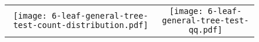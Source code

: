 \documentclass[border=10pt,varwidth=30cm]{standalone}
\begin{document}
\begin{figure}
    \setlength\arrayrulewidth{2pt}
    \centering
    \begin{tabular}{@{}cc@{}}
        \texttt{[image: 6-leaf-general-tree-test-count-distribution.pdf]}
        &
        \texttt{[image: 6-leaf-general-tree-test-qq.pdf]}
        \\
    \end{tabular}
\end{figure}
\end{document}
